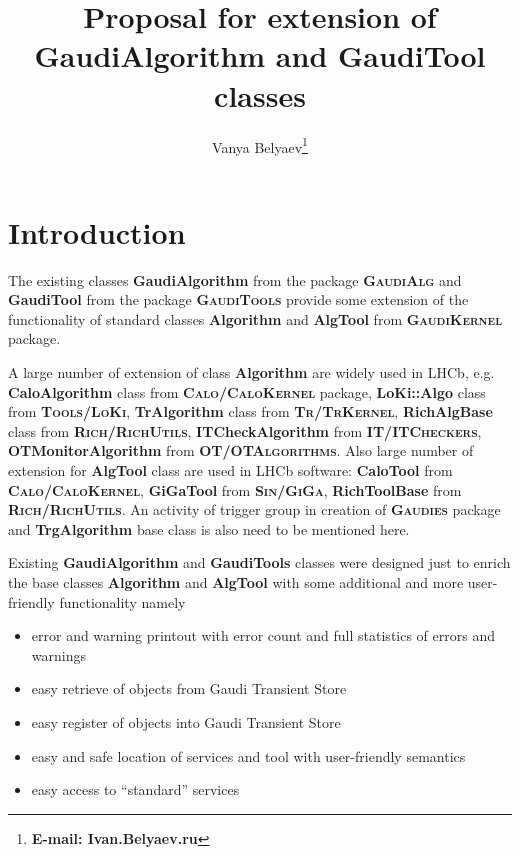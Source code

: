 \documentclass{lhcbnote}
\newcommand{\bftt}         {\ttfamily\bfseries}
\newcommand{\scbf}         {\scshape\bfseries}
\renewcommand{\tt}         {\ttfamily}
\begin{document}
\lstset{language=[ANSI]C++}
\lstset{indent=15mm}
\lstset{labelstep=1}
\lstset{labelstyle=\tt\tiny}


\docmod{\today}

\title{Proposal for extension of {\bftt{GaudiAlgorithm}} and {\bftt{GaudiTool}} classes}
\author{Vanya Belyaev\footnote{\bftt{E-mail: Ivan.Belyaev\@itep.ru}}}
\maketitle

\chapter{Introduction}

The existing classes {\bftt{GaudiAlgorithm}} from the
package {\scbf{GaudiAlg}} and
{\bftt{GaudiTool}} from the package
{\scbf{GaudiTools}} provide some extension of
the functionality of standard classes {\bftt{Algorithm}}
and {\bftt{AlgTool}} from {\scbf{GaudiKernel}} package.

A large number of extension of
class {\bftt{Algorithm}} are widely used in
LHCb, e.g. {\bftt{CaloAlgorithm}} class from
{\scbf{Calo/CaloKernel}} package, {\bftt{LoKi::Algo}}
class from {\scbf{Tools/LoKi}}, {\bftt{TrAlgorithm}}
class from {\scbf{Tr/TrKernel}},
{\bftt{RichAlgBase}} class from {\scbf{Rich/RichUtils}},
{\bftt{ITCheckAlgorithm}} from
{\scbf{IT/ITCheckers}},
{\bftt{OTMonitorAlgorithm}} from {\scbf{OT/OTAlgorithms}}.
Also large number of extension for {\bftt{AlgTool}} class
are used in LHCb software:
{\bftt{CaloTool}} from {\scbf{Calo/CaloKernel}},
{\bftt{GiGaTool}} from {\scbf{Sin/GiGa}},
{\bftt{RichToolBase}} from
{\scbf{Rich/RichUtils}}. An activity of trigger
group in creation of {\scbf{Gaudies}} package and
{\bftt{TrgAlgorithm}} base class is also need to be mentioned here.

Existing {\bftt{GaudiAlgorithm}} and
{\bftt{GaudiTools}} classes were designed
just to enrich the base classes
{\bftt{Algorithm}} and {\bftt{AlgTool}}
with some additional and more user-friendly
functionality namely
\begin{itemize}
 \item error and warning printout with error count
   and full statistics of errors and warnings
 \item easy retrieve of objects from Gaudi Transient Store
 \item easy register of objects into Gaudi Transient Store
 \item easy and safe location of services and tool
       with user-friendly semantics
 \item easy access to ``standard'' services
\end{itemize}
\end{document}
